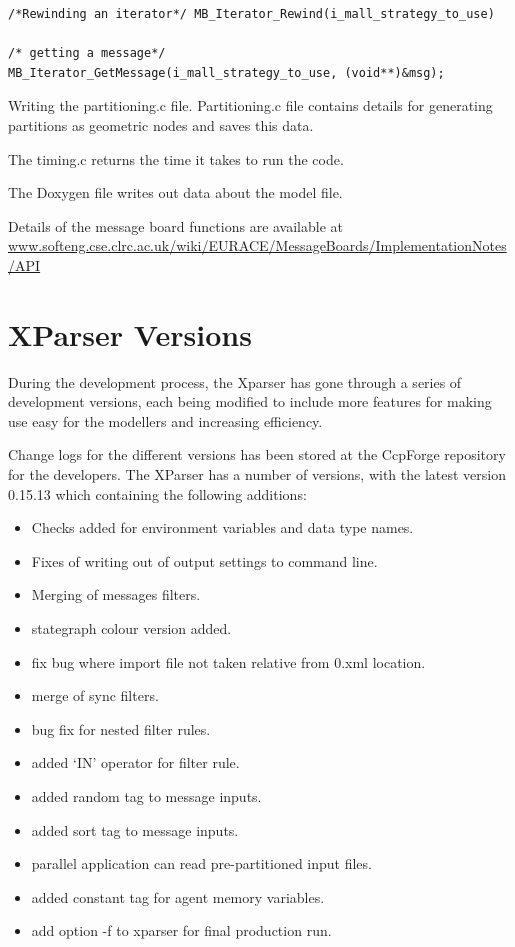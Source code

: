 \documentclass[a4paper,11pt]{article}
\newenvironment{mylisting}
{\begin{list}{}{\setlength{\leftmargin}{1em}}\item\small\bfseries}
{\end{list}}
\begin{document}
\begin{enumerate}
\begin{mylisting}
\begin{verbatim}
/*Rewinding an iterator*/ MB_Iterator_Rewind(i_mall_strategy_to_use)

/* getting a message*/
MB_Iterator_GetMessage(i_mall_strategy_to_use, (void**)&msg);
\end{verbatim}
\end{mylisting}

\item Writing the partitioning.c file. Partitioning.c file contains details for generating partitions as geometric nodes and saves this data.
\item The timing.c returns the time it takes to run the code.
\item The Doxygen file writes out data about the model file.

\end{enumerate}

Details of the message board functions are available at
\url{www.softeng.cse.clrc.ac.uk/wiki/EURACE/MessageBoards/ImplementationNotes/API}

\section{XParser Versions}

During the development process, the Xparser has gone through a
series of development versions, each being modified to include more
features for making use easy for the modellers and increasing
efficiency.

Change logs for the different versions has been stored at the
CcpForge repository for the developers. The XParser has a number of
versions, with the latest version 0.15.13 which containing the
following additions:
\begin{itemize}
\item Checks added for environment variables and data type names.
\item Fixes of writing out of output settings to command line.
\item Merging of messages filters.
\item    stategraph colour version added.
\item    fix bug where import file not taken relative from 0.xml location.
\item    merge of sync filters.
\item    bug fix for nested filter rules.
\item added `IN' operator for filter rule.
\item added random tag to message inputs.
\item added sort tag to message inputs.
\item parallel application can read pre-partitioned input files.
\item added constant tag for agent memory variables.
\item add option -f to xparser for final production run.
\end{itemize}
\end{document}
